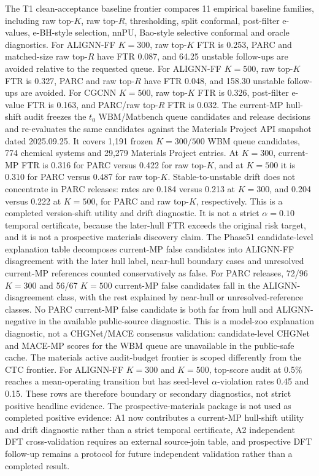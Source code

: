 \documentclass[11pt]{article}
\begin{document}
The T1 clean-acceptance baseline frontier compares 11 empirical baseline families, including raw top-\(K\), raw top-\(R\), thresholding, split conformal, post-filter e-values, e-BH-style selection, nnPU, Bao-style selective conformal and oracle diagnostics.
For ALIGNN-FF \(K=300\), raw top-\(K\) FTR is 0.253, PARC and matched-size raw top-\(R\) have FTR 0.087, and 64.25 unstable follow-ups are avoided relative to the requested queue.
For ALIGNN-FF \(K=500\), raw top-\(K\) FTR is 0.327, PARC and raw top-\(R\) have FTR 0.048, and 158.30 unstable follow-ups are avoided.
For CGCNN \(K=500\), raw top-\(K\) FTR is 0.326, post-filter e-value FTR is 0.163, and PARC/raw top-\(R\) FTR is 0.032.
The current-MP hull-shift audit freezes the \(t_0\) WBM/Matbench queue candidates and release decisions and re-evaluates the same candidates against the Materials Project API snapshot dated 2025.09.25.
It covers 1,191 frozen \(K=300/500\) WBM queue candidates, 774 chemical systems and 29,279 Materials Project entries.
At \(K=300\), current-MP FTR is 0.316 for PARC versus 0.422 for raw top-\(K\), and at \(K=500\) it is 0.310 for PARC versus 0.487 for raw top-\(K\).
Stable-to-unstable drift does not concentrate in PARC releases: rates are 0.184 versus 0.213 at \(K=300\), and 0.204 versus 0.222 at \(K=500\), for PARC and raw top-\(K\), respectively.
This is a completed version-shift utility and drift diagnostic.
It is not a strict \(\alpha=0.10\) temporal certificate, because the later-hull FTR exceeds the original risk target, and it is not a prospective materials discovery claim.
The Phase51 candidate-level explanation table decomposes current-MP false candidates into ALIGNN-FF disagreement with the later hull label, near-hull boundary cases and unresolved current-MP references counted conservatively as false.
For PARC releases, 72/96 \(K=300\) and 56/67 \(K=500\) current-MP false candidates fall in the ALIGNN-disagreement class, with the rest explained by near-hull or unresolved-reference classes.
No PARC current-MP false candidate is both far from hull and ALIGNN-negative in the available public-source diagnostic.
This is a model-zoo explanation diagnostic, not a CHGNet/MACE consensus validation: candidate-level CHGNet and MACE-MP scores for the WBM queue are unavailable in the public-safe cache.
The materials active audit-budget frontier is scoped differently from the CTC frontier.
For ALIGNN-FF \(K=300\) and \(K=500\), top-score audit at 0.5\% reaches a mean-operating transition but has seed-level \(\alpha\)-violation rates 0.45 and 0.15.
These rows are therefore boundary or secondary diagnostics, not strict positive headline evidence.
The prospective-materials package is not used as completed positive evidence: A1 now contributes a current-MP hull-shift utility and drift diagnostic rather than a strict temporal certificate, A2 independent DFT cross-validation requires an external source-join table, and prospective DFT follow-up remains a protocol for future independent validation rather than a completed result.
\end{document}
